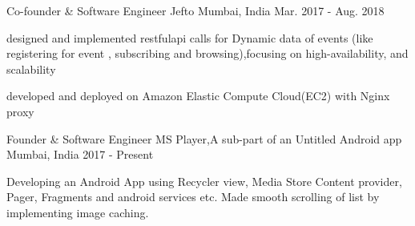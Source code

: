 

\begin{cventries}
  
  \cventry
    {Co-founder \& Software Engineer} %
    {Jefto} %
    {Mumbai, India} %
    {Mar. 2017 - Aug. 2018} %
    {
      \begin{cvitems} %
        \item {designed and implemented restful\-api calls for Dynamic data of events (like registering for event , subscribing and browsing),focusing on high-availability, and scalability }
        \item {developed  and deployed on Amazon Elastic Compute Cloud(EC2) with Nginx proxy}
      \end{cvitems}
    }

\end{cventries}



\begin{cventries}

  \cventry
    {Founder \& Software Engineer} %
    {MS Player,A sub-part of an Untitled Android app} %
    {Mumbai, India} %
    { 2017 - Present} %
    {
      \begin{cvitems} %
        \item {Developing an Android App using Recycler view, Media Store Content provider, Pager, Fragments and android services etc. Made smooth scrolling of list by implementing image caching. }
      \end{cvitems}
    }


\end{cventries}

